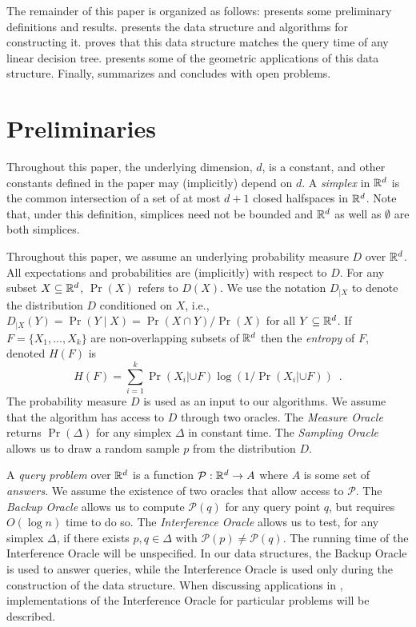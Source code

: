 \documentclass{patmorin}
\begin{document}
The remainder of this paper is organized as follows: 
presents some preliminary definitions and results. 
presents the data structure and algorithms for constructing it.
 proves that this data structure matches the query
time of any linear decision tree.   presents
some of the geometric applications of this data structure. Finally,
 summarizes and concludes with open problems.

\section{Preliminaries}

Throughout this paper, the underlying dimension, $d$, is a constant, and
other constants defined in the paper may (implicitly) depend on $d$.
A \emph{simplex} in $\mathbb{R}^d$ is the common intersection of a set of at most
$d+1$ closed halfspaces in $\mathbb{R}^d$. Note that, under this definition,
simplices need not be bounded and $\mathbb{R}^d$ as well as $\emptyset$ are
both simplices.

Throughout this paper, we assume an underlying probability measure
$D$ over $\mathbb{R}^d$.  All expectations and probabilities are (implicitly)
with respect to $D$.  For any subset $X\subseteq\mathbb{R}^d$, $\Pr(X)$ refers
to $D(X)$.  We use the notation $D_{|X}$ to denote the distribution $D$
conditioned on $X$, i.e., $D_{|X}(Y)=\Pr(Y\mid X)=\Pr(X\cap Y)/\Pr(X)$
for all $Y\subseteq\mathbb{R}^d$.  If $F=\{X_1,\ldots,X_k\}$ are non-overlapping
subsets of $\mathbb{R}^d$ then the \emph{entropy} of $F$, denoted $H(F)$ is
\[
    H(F) = \sum_{i=1}^k \Pr(X_i|{\cup F})\log(1/\Pr(X_i|{\cup F})) \enspace .
\]
The probability measure $D$ is used as an input to our algorithms.
We assume that the algorithm has access to $D$ through two oracles.
The \emph{Measure Oracle} returns $\Pr(\Delta)$ for any simplex $\Delta$
in constant time.  The \emph{Sampling Oracle} allows us to draw a random
sample $p$ from the distribution $D$.

A \emph{query problem} over $\mathbb{R}^d$ is a function
$\mathcal{P}:\mathbb{R}^d\rightarrow A$ where $A$ is some set of \emph{answers}.
We assume the existence of two oracles that allow access to $\mathcal{P}$.
The \emph{Backup Oracle} allows us to compute $\mathcal{P}(q)$ for
any query point $q$, but requires $O(\log n)$ time to do so.  The
\emph{Interference Oracle} allows us to test, for any simplex $\Delta$,
if there exists $p,q\in\Delta$ with $\mathcal{P}(p)\neq\mathcal{P}(q)$.
The running time of the Interference Oracle will be unspecified.
In our data structures, the Backup Oracle is used to answer queries,
while the Interference Oracle is used only during the construction of the
data structure.  When discussing applications in ,
implementations of the Interference Oracle for particular problems will
be described.
\end{document}
